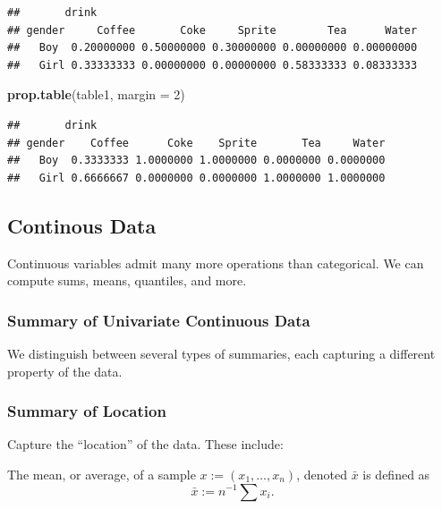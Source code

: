\documentclass[]{book}
\newenvironment{Shaded}{\begin{snugshade}}{\end{snugshade}}
\newcommand{\KeywordTok}[1]{\textcolor[rgb]{0.13,0.29,0.53}{\textbf{#1}}}
\newcommand{\DataTypeTok}[1]{\textcolor[rgb]{0.13,0.29,0.53}{#1}}
\newcommand{\DecValTok}[1]{\textcolor[rgb]{0.00,0.00,0.81}{#1}}
\newcommand{\NormalTok}[1]{#1}
\theoremstyle{definition}
\theoremstyle{definition}
\theoremstyle{definition}
\theoremstyle{remark}
\let\BeginKnitrBlock\begin \let\EndKnitrBlock\end
\begin{document}
\begin{verbatim}
##       drink
## gender     Coffee       Coke     Sprite        Tea      Water
##   Boy  0.20000000 0.50000000 0.30000000 0.00000000 0.00000000
##   Girl 0.33333333 0.00000000 0.00000000 0.58333333 0.08333333
\end{verbatim}

\begin{Shaded}
\begin{Highlighting}[]
\KeywordTok{prop.table}\NormalTok{(table1, }\DataTypeTok{margin =} \DecValTok{2}\NormalTok{)}
\end{Highlighting}
\end{Shaded}

\begin{verbatim}
##       drink
## gender    Coffee      Coke    Sprite       Tea     Water
##   Boy  0.3333333 1.0000000 1.0000000 0.0000000 0.0000000
##   Girl 0.6666667 0.0000000 0.0000000 1.0000000 1.0000000
\end{verbatim}

\subsection{Continous Data}\label{continous-data}

Continuous variables admit many more operations than categorical. We can
compute sums, means, quantiles, and more.

\subsubsection{Summary of Univariate Continuous
Data}\label{summary-of-univariate-continuous-data}

We distinguish between several types of summaries, each capturing a
different property of the data.

\subsubsection{Summary of Location}\label{summary-of-location}

Capture the ``location'' of the data. These include:

\BeginKnitrBlock{definition}[Average]
\protect\hypertarget{def:unnamed-chunk-70}{}{\label{def:unnamed-chunk-70}
{} }The mean, or average, of a sample
\(x:=(x_1,\dots,x_n)\), denoted \(\bar x\) is defined as
\[ \bar x := n^{-1} \sum x_i. \]
\EndKnitrBlock{definition}
\end{document}
